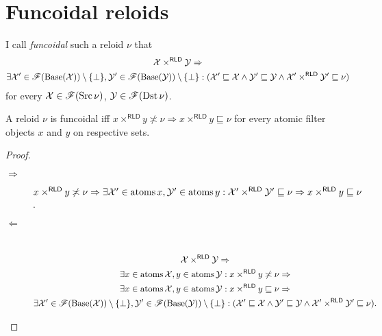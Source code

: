 \section{\label{fcd-rld}Funcoidal reloids}
\begin{defn}
I call \emph{funcoidal} such a reloid $\nu$
that
\begin{multline*}
\mathcal{X}\times^{\mathsf{RLD}}\mathcal{Y}\Rightarrow\\
\exists\mathcal{X}'\in\mathscr{F}(\operatorname{Base}(\mathcal{X}))\setminus\{\bot\},\mathcal{Y}'\in\mathscr{F}(\operatorname{Base}(\mathcal{Y}))\setminus\{\bot\}:(\mathcal{X}'\sqsubseteq\mathcal{X}\land\mathcal{Y}'\sqsubseteq\mathcal{Y}\land\mathcal{X}'\times^{\mathsf{RLD}}\mathcal{Y}'\sqsubseteq\nu)
\end{multline*}
for every $\mathcal{X}\in\mathscr{F}(\operatorname{Src}\nu)$, $\mathcal{Y}\in\mathscr{F}(\operatorname{Dst}\nu)$.\end{defn}
\begin{prop}
A reloid $\nu$ is funcoidal iff $x\times^{\mathsf{RLD}}y\nasymp\nu\Rightarrow x\times^{\mathsf{RLD}}y\sqsubseteq\nu$
for every atomic filter objects $x$ and $y$ on respective sets.\end{prop}
\begin{proof}
~
\begin{description}
\item [{$\Rightarrow$}] $x\times^{\mathsf{RLD}}y\not\asymp\nu\Rightarrow\exists\mathcal{X}'\in\operatorname{atoms} x,\mathcal{Y}'\in\operatorname{atoms} y:\mathcal{X}'\times^{\mathsf{RLD}}\mathcal{Y}'\sqsubseteq\nu\Rightarrow x\times^{\mathsf{RLD}}y\sqsubseteq\nu$.
\item [{$\Leftarrow$}] ~
\begin{multline*}
\mathcal{X}\times^{\mathsf{RLD}}\mathcal{Y}\Rightarrow\\
\exists x\in\operatorname{atoms}\mathcal{X},y\in\operatorname{atoms}\mathcal{Y}:x\times^{\mathsf{RLD}}y\not\asymp\nu\Rightarrow\\
\exists x\in\operatorname{atoms}\mathcal{X},y\in\operatorname{atoms}\mathcal{Y}:x\times^{\mathsf{RLD}}y\sqsubseteq\nu\Rightarrow\\
\exists\mathcal{X}'\in\mathscr{F}(\operatorname{Base}(\mathcal{X}))\setminus\{\bot\},\mathcal{Y}'\in\mathscr{F}(\operatorname{Base}(\mathcal{Y}))\setminus\{\bot\}:(\mathcal{X}'\sqsubseteq\mathcal{X}\land\mathcal{Y}'\sqsubseteq\mathcal{Y}\land\mathcal{X}'\times^{\mathsf{RLD}}\mathcal{Y}'\sqsubseteq\nu).
\end{multline*}

\end{description}
\end{proof}
